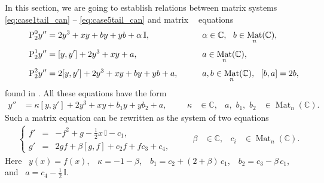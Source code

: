 \documentclass{article}
\theoremstyle{plain}
\DeclareMathOperator{\Mat}{Mat}
\DeclareMathOperator{\PII}{P_{2}}
\begin{document}
In this section, we are going to establish relations between matrix systems \ref{eq:case1tail_can} -- \ref{eq:case5tail_can} and matrix $\PII$ equations 
\begin{alignat}{2}
    \label{P20}
    \tag*{$\text{P}_2^0$}
    & y''= 2 y^3 + x y + b y + y b + \alpha \, \mathbb{I}, 
    &\qquad
    & \alpha \in {\mathbb C},~~
    b \in \Mat_n (\mathbb{C}),
    \\[1mm]
    \label{P21}
    \tag*{$\text{P}_2^1$}
    & y''= [y,y'] + 2 y^3 + x y + a, 
    &
    & a \in \Mat_n (\mathbb{C}),
    \\[1mm]
    \label{P22}
    \tag*{$\text{P}_2^2$}
    & y''= 2 [y,y'] + 2 y^3 + x y + b y + y b + a, 
    &
    & a, b \in \Mat_n (\mathbb{C}),~~ 
    [b,a] = 2 b,
\end{alignat}
found in \cite{Adler_Sokolov_2020_1}. All these equations have the form
\begin{align}
    y'' 
    &= \kappa [y, y']
    + 2 y^3 + x y + b_1 y + y b_2 + a,
    &&&
    \kappa
    &\in \mathbb{C}, 
    &
    a, \,\, 
    b_1, \,\,
    b_2
    &\in \Mat_n (\mathbb{C}).
\end{align}
Such a matrix equation can be rewritten as the system of two equations
\begin{align} \label{eq:P2matsys}
     &\left\{
    \begin{array}{lcl}
         f'
         &=& - f^2 + g - \frac12 x \, \mathbb{I} - c_1,  
         \\[2mm]
         g'
         &=& 2 g f + \beta [g, f] 
         + c_2 f + f c_3 + c_4,
    \end{array}
    \right.
    &&&
    \beta
    &\in \mathbb{C}, 
    &
    c_i 
    &\in \Mat_n (\mathbb{C}).
\end{align}
Here \, $y (x) = f (x)$, \,\, $\kappa = - 1 - \beta$, \,\, $b_1 = c_2 + (2 + \beta) \, c_1$, \,\, $b_2 = c_3 - \beta \, c_1$, \, and \, $a = c_4 - \frac12 \, \mathbb{I}$.
\end{document}
